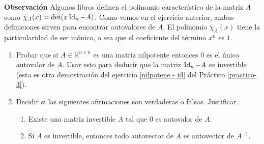 \textbf{Observación} Algunos libros definen el polinomio característico de la matriz $A$ como $\tilde\chi_A(x)=\det(x\operatorname{Id}_n-A)$. Como vemos en el ejercicio anterior, ambas definiciones sirven para encontrar autovalores de $A$. El polinomio $\tilde\chi_A(x)$ tiene la particularidad de ser mónico, o sea que el coeficiente del término $x^n$ es $1$.

\begin{enumerate}[resume,topsep=6pt,itemsep=.4cm]

\item Probar que si $A\in\mathbb{K}^{n\times n}$ es una matriz nilpotente entonces $0$ es el único autovalor de $A$. Usar esto para deducir que la matriz $\operatorname{Id}_n-A$ es invertible (esta es otra demostración del ejercicio \ref{nilpotene - id} del Práctico \ref{practico-3}).


\item Decidir si las siguientes afirmaciones son verdaderas o falsas. Justificar.

\begin{enumerate}
    \item Existe una matriz invertible $A$ tal que $0$ es autovalor de $A$.
    \item  Si $A$ es invertible, entonces todo autovector de $A$ es autovector de $A^{-1}$.
\end{enumerate}




\end{enumerate}
